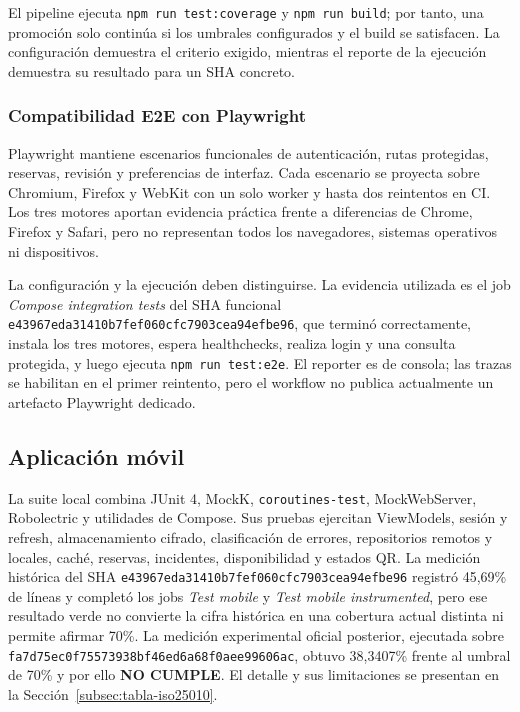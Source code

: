 El pipeline ejecuta \texttt{npm run test:coverage} y \texttt{npm run build}; por
tanto, una promoción solo continúa si los umbrales configurados y el build se
satisfacen. La configuración demuestra el criterio exigido, mientras el reporte
de la ejecución demuestra su resultado para un SHA concreto.

\subsubsection{Compatibilidad E2E con Playwright}

Playwright mantiene escenarios funcionales de autenticación, rutas protegidas,
reservas, revisión y preferencias de interfaz. Cada escenario se proyecta sobre
Chromium, Firefox y WebKit con un
solo worker y hasta dos reintentos en CI. Los tres motores aportan evidencia
práctica frente a diferencias de Chrome, Firefox y Safari, pero no representan
todos los navegadores, sistemas operativos ni dispositivos.

La configuración y la ejecución deben distinguirse. La evidencia utilizada es
el job \emph{Compose integration tests} del SHA funcional
\texttt{e43967eda31410b7fef060cfc7903cea94efbe96}, que terminó correctamente,
instala los tres motores, espera healthchecks, realiza login y una consulta
protegida, y luego ejecuta \texttt{npm run test:e2e}. El reporter es de consola;
las trazas se habilitan en el primer reintento, pero el workflow no publica
actualmente un artefacto Playwright dedicado.

\subsection{Aplicación móvil}
\label{subsec:pruebas-mobile}

La suite local combina JUnit 4, MockK, \texttt{coroutines-test}, MockWebServer,
Robolectric y utilidades de Compose. Sus pruebas ejercitan
ViewModels, sesión y refresh, almacenamiento cifrado, clasificación de errores,
repositorios remotos y locales, caché, reservas, incidentes, disponibilidad y
estados QR. La medición histórica del SHA
\texttt{e43967eda31410b7fef060cfc7903cea94efbe96} registró 45,69\% de
líneas y completó los jobs
\emph{Test mobile} y \emph{Test mobile instrumented}, pero ese resultado verde
no convierte la cifra histórica en una cobertura actual distinta ni permite
afirmar 70\%. La medición experimental oficial posterior, ejecutada sobre
\texttt{fa7d75ec0f75573938bf46ed6a68f0aee99606ac}, obtuvo 38,3407\%
frente al umbral de 70\% y por ello \textbf{NO CUMPLE}. El detalle y sus
limitaciones se presentan en la Sección~\ref{subsec:tabla-iso25010}.

